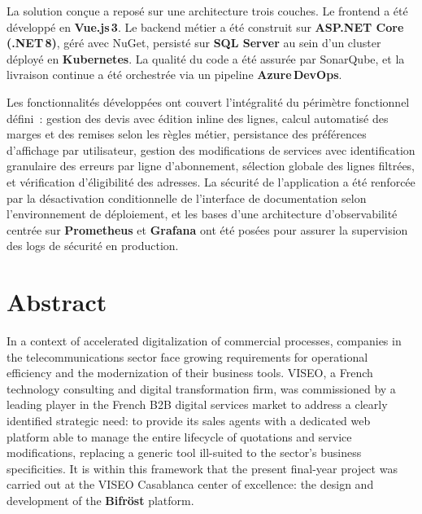 \vspace{0.2cm}

La solution con\c{c}ue a repos\'e sur une architecture trois couches. Le frontend a \'et\'e d\'evelopp\'e en \textbf{Vue.js\,3}. Le backend m\'etier a \'et\'e construit sur \textbf{ASP.NET Core (.NET\,8)}, g\'er\'e avec NuGet, persist\'e sur \textbf{SQL Server} au sein d'un cluster  d\'eploy\'e en  \textbf{Kubernetes}. La qualit\'e du code a \'et\'e assur\'ee par SonarQube, et la livraison continue a \'et\'e orchestr\'ee via un pipeline \textbf{Azure\,DevOps}.

\vspace{0.2cm}

Les fonctionnalit\'es d\'evelopp\'ees ont couvert l'int\'egralit\'e du p\'erim\`etre fonctionnel d\'efini~: gestion des devis avec \'edition inline des lignes, calcul automatis\'e des marges et des remises selon les r\`egles m\'etier, persistance des pr\'ef\'erences d'affichage par utilisateur, gestion des modifications de services avec identification granulaire des erreurs par ligne d'abonnement, s\'election globale des lignes filtr\'ees, et v\'erification d'\'eligibilit\'e des adresses. La s\'ecurit\'e de l'application a \'et\'e renforc\'ee par la d\'esactivation conditionnelle de l'interface de documentation selon l'environnement de d\'eploiement, et les bases d'une architecture d'observabilit\'e centr\'ee sur \textbf{Prometheus} et \textbf{Grafana} ont \'et\'e pos\'ees pour assurer la supervision des logs de s\'ecurit\'e en production.

\vspace{0.3cm}

\clearpage

\chapter*{Abstract}
\thispagestyle{empty}

In a context of accelerated digitalization of commercial processes, companies in the telecommunications sector face growing requirements for operational efficiency and the modernization of their business tools. VISEO, a French technology consulting and digital transformation firm, was commissioned by a leading player in the French B2B digital services market to address a clearly identified strategic need: to provide its sales agents with a dedicated web platform able to manage the entire lifecycle of quotations and service modifications, replacing a generic tool ill-suited to the sector's business specificities. It is within this framework that the present final-year project was carried out at the VISEO Casablanca center of excellence: the design and development of the \textbf{Bifr\"ost} platform.


